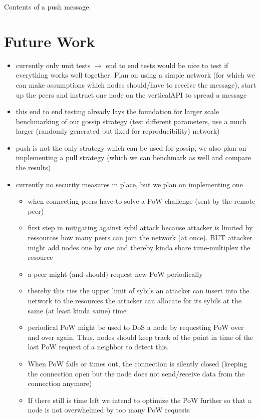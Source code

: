 \documentclass[a4paper,english,10pt,NET]{tumarticle}
\newcommand{\tos}{$\to$\xspace}
\begin{document}
\begin{table}
	\centering
	
	\caption{Contents of a push message.}
	\label{tab:push}
\end{table}

\section{Future Work} \label{sec:future}
\begin{itemize}
	\item currently only unit tests \tos end to end tests would be nice to test if everything works well together. Plan on using a simple network (for which we can make assumptions which nodes should/have to receive the message), start up the peers and instruct one node on the verticalAPI to spread a message
	\item this end to end testing already lays the foundation for larger scale benchmarking of our gossip strategy (test different parameters, use a much larger (randomly generated but fixed for reproducibility) network)
	\item push is not the only strategy which can be used for gossip, we also plan on implementing a pull strategy (which we can benchmark as well and compare the results)
	\item currently no security measures in place, but we plan on implementing one
		\begin{itemize}
			\item when connecting peers have to solve a PoW challenge (sent by the remote peer)
			\item first step in mitigating against sybil attack because attacker is limited by ressources how many peers can join the network (at once). BUT attacker might add nodes one by one and thereby kinda share time-multiplex the resource
			\item a peer might (and should) request new PoW periodically
			\item thereby this ties the upper limit of sybils an attacker can insert into the network to the resources the attacker can allocate for its sybils at the same (at least kinda same) time
			\item periodical PoW might be used to DoS a node by requesting PoW over and over again. Thus, nodes should keep track of the point in time of the last PoW request of a neighbor to detect this.
			\item When PoW fails or times out, the connection is silently closed (keeping the connection open but the node does not send/receive data from the connection anymore)
			\item If there still is time left we intend to optimize the PoW further so that a node is not overwhelmed by too many PoW requests
		\end{itemize}
\end{itemize}
\end{document}

